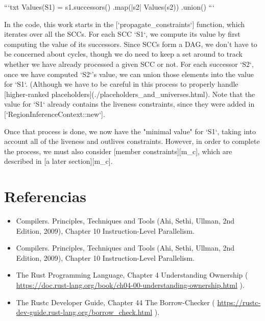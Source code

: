 \documentclass[12pt, a4paper]{article}
\begin{document}
```txt
Values(S1) =
  s1.successors()
    .map(|s2| Values(s2))
    .union()
```

In the code, this work starts in the [`propagate_constraints`]
function, which iterates over all the SCCs. For each SCC `S1`, we
compute its value by first computing the value of its
successors. Since SCCs form a DAG, we don't have to be concerned about
cycles, though we do need to keep a set around to track whether we
have already processed a given SCC or not. For each successor `S2`, once
we have computed `S2`'s value, we can union those elements into the
value for `S1`. (Although we have to be careful in this process to
properly handle [higher-ranked
placeholders](./placeholders_and_universes.html). Note that the value
for `S1` already contains the liveness constraints, since they were
added in [`RegionInferenceContext::new`].

Once that process is done, we now have the "minimal value" for `S1`,
taking into account all of the liveness and outlives
constraints. However, in order to complete the process, we must also
consider [member constraints][m_c], which are described in [a later
section][m_c].

\section{Referencias}

\begin{itemize}
\item Compilers. Principles, Techniques and Tools (Ahi, Sethi, Ullman, 2nd Edition, 2009), Chapter 10 Instruction-Level Parallelism.
\item Compilers. Principles, Techniques and Tools (Ahi, Sethi, Ullman, 2nd Edition, 2009), Chapter 10 Instruction-Level Parallelism.
\item The Rust Programming Language, Chapter 4 Understanding Ownership 
      ( \url{https://doc.rust-lang.org/book/ch04-00-understanding-ownership.html} ). 
\item The Rustc Developer Guide, Chapter 44 The Borrow-Checker 
      ( \url{https://rustc-dev-guide.rust-lang.org/borrow_check.html} ). 
\end{itemize}
\end{document}
